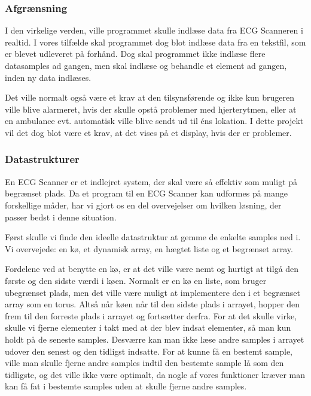 \documentclass{article}
\begin{document}
\subsubsection{Afgrænsning}
I den virkelige verden, ville programmet skulle indlæse data fra ECG Scanneren i realtid. I vores tilfælde skal programmet dog blot indlæse data fra en tekstfil, som er blevet udleveret på forhånd. Dog skal programmet ikke indlæse flere datasamples ad gangen, men skal indlæse og behandle et element ad gangen, inden ny data indlæses.

Det ville normalt også være et krav at den tilsynsførende og ikke kun brugeren ville blive alarmeret, hvis der skulle opstå problemer med hjerterytmen, eller at en ambulance evt. automatisk ville blive sendt ud til éns lokation. I dette projekt vil det dog blot være et krav, at det vises på et display, hvis der er problemer.

\subsubsection{Datastrukturer}
En ECG Scanner er et indlejret system, der skal være så effektiv som muligt på begrænset plads. Da et program til en ECG Scanner kan udformes på mange forskellige måder, har vi gjort os en del overvejelser om hvilken løsning, der passer bedst i denne situation.

Først skulle vi finde den ideelle datastruktur at gemme de enkelte samples ned i. Vi overvejede: en kø, et dynamisk array, en hægtet liste og et begrænset array.

Fordelene ved at benytte en kø, er at det ville være nemt og hurtigt at tilgå den første og den sidste værdi i køen. Normalt er en kø en liste, som bruger ubegrænset plads, men det ville være muligt at implementere den i et begrænset array som en torus. Altså når køen når til den sidste plads i arrayet, hopper den frem til den forreste plads i arrayet og fortsætter derfra. For at det skulle virke, skulle vi fjerne elementer i takt med at der blev indsat elementer, så man kun holdt på de seneste samples. Desværre kan man ikke læse andre samples i arrayet udover den senest og den tidligst indsatte. For at kunne få en bestemt sample, ville man skulle fjerne andre samples indtil den bestemte sample lå som den tidligste, og det ville ikke være optimalt, da nogle af vores funktioner kræver man kan få fat i bestemte samples uden at skulle fjerne andre samples.
\end{document}
